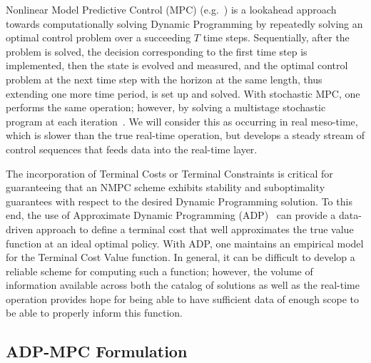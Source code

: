 \documentclass{article}
\newcommand{\1}{\mathds{1}}          %
\theoremstyle{definition}
\begin{document}
\begin{sloppypar}
Nonlinear Model Predictive Control (MPC) (e.g.~\cite{allgower2012nonlinear}) is a lookahead approach towards computationally solving Dynamic Programming by repeatedly solving an optimal control problem over a succeeding $T$ time steps. Sequentially, after the problem is solved, the decision corresponding to the first time step is implemented, then the state is evolved and measured, and the optimal control problem at the next time step with the horizon at the same length, thus extending one more time period, is set up and solved. With stochastic MPC, one performs the same operation; however, by solving a multistage stochastic program at each iteration~\cite{mesbah2016stochastic}. We will consider this as occurring in real meso-time, which is slower than the true real-time operation, but develops a steady stream of control sequences that feeds data into the real-time layer.

The incorporation of Terminal Costs or Terminal Constraints is critical for guaranteeing that an NMPC scheme exhibits stability and suboptimality guarantees with respect to the desired Dynamic Programming solution. To this end, the use of Approximate Dynamic Programming (ADP)~\cite{powell2007approximate} can provide a data-driven approach to define a terminal cost that well approximates the true value function at an ideal optimal policy. With ADP, one maintains an empirical model for the Terminal Cost Value function. In general, it can be difficult to develop a reliable scheme for computing such a function; however, the volume of information available across both the catalog of solutions as well as the real-time operation provides hope for being able to have sufficient data of enough scope to be able to properly inform this function.



\subsection{ADP-MPC Formulation}



\end{sloppypar}
\end{document}
